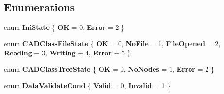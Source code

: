 \subsection*{Enumerations}
\begin{DoxyCompactItemize}
\item 
\mbox{\label{namespace_c_a_d_tools_a5747a1217bb8213efc192ebff6b0088f}} 
enum {\bfseries Ini\+State} \{ {\bfseries OK} = 0, 
{\bfseries Error} = 2
 \}
\item 
\mbox{\label{namespace_c_a_d_tools_ab026c597d16265741e3aaa16d9805d1e}} 
enum {\bfseries C\+A\+D\+Class\+File\+State} \{ \newline
{\bfseries OK} = 0, 
{\bfseries No\+File} = 1, 
{\bfseries File\+Opened} = 2, 
{\bfseries Reading} = 3, 
\newline
{\bfseries Writing} = 4, 
{\bfseries Error} = 5
 \}
\item 
\mbox{\label{namespace_c_a_d_tools_a67bd10b4498bf2698e8ec6c5718ffd4f}} 
enum {\bfseries C\+A\+D\+Class\+Tree\+State} \{ {\bfseries OK} = 0, 
{\bfseries No\+Nodes} = 1, 
{\bfseries Error} = 2
 \}
\item 
\mbox{\label{namespace_c_a_d_tools_a1ac9d4e2ef37bbe8447566161d313daf}} 
enum {\bfseries Data\+Validate\+Cond} \{ {\bfseries Valid} = 0, 
{\bfseries Invalid} = 1
 \}
\end{DoxyCompactItemize}
